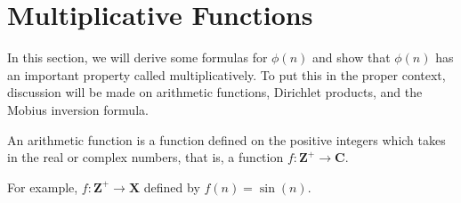 \section{Multiplicative Functions}
In this section, we will derive some formulas for $ \phi(n) $ and show that $ \phi(n) $ has an important property called multiplicatively.
To put this in the proper context, discussion will be made on arithmetic functions, Dirichlet products, and the Mobius inversion formula.
\begin{Definition}{}{}
    An arithmetic function is a function defined on the positive integers which takes in the real or complex numbers, that is,
    a function $ f\colon \mathbf{Z}^+\to \mathbf{C} $.
\end{Definition}
For example, $ f\colon \mathbf{Z}^+\to \mathbf{X} $ defined by $ f(n)=\sin(n) $.

